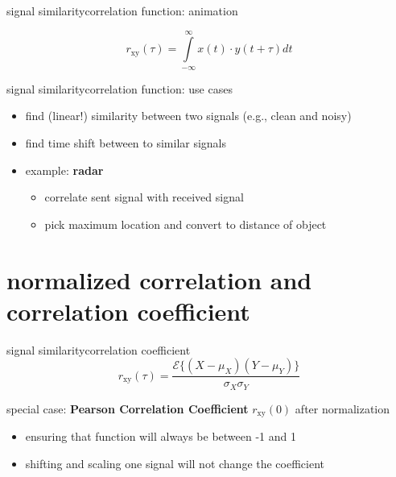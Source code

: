 \begin{frame}{signal similarity}{correlation function: animation}
    \vspace{-5mm}
    \begin{footnotesize}
    \begin{equation*}
        r_\mathrm{xy}(\tau) = \int\limits_{-\infty}^{\infty}{x(t)\cdot y(t+\tau)}dt
    \end{equation*}
    \end{footnotesize}
\end{frame}

\begin{frame}{signal similarity}{correlation function: use cases}
    \begin{itemize}
        \item   find (linear!) similarity between two signals (e.g., clean and noisy)
        \item   find time shift between to similar signals
        \pause
        \bigskip
        \item   example: \textbf{radar}
            \begin{itemize}
                \item   correlate sent signal with received signal
                \item   pick maximum location and convert to distance of object
            \end{itemize}
    \end{itemize}
\end{frame}

\section[correlation coefficient]{normalized correlation and correlation coefficient}
\begin{frame}{signal similarity}{correlation coefficient}
    \begin{equation*}\nonumber
        r_\mathrm{xy}(\tau) = \frac{\mathcal{E}\lbrace(X-\mu_X)(Y-\mu_Y)\rbrace}{\sigma_X\sigma_Y}
    \end{equation*}
    
    special case: \textbf{Pearson Correlation Coefficient} $r_\mathrm{xy}(0)$ after normalization
    \bigskip
    \bigskip
        \begin{itemize}
            \item   ensuring that function will always be between -1 and 1
            \item   shifting and scaling one signal will not change the coefficient
        \end{itemize}
\end{frame}

